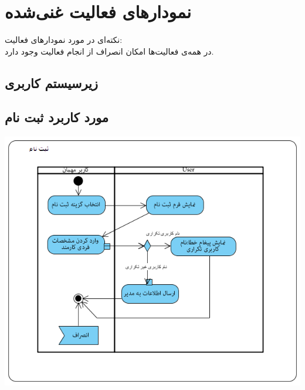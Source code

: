 
\newpage
\section{نمودارهای فعالیت غنی‌شده}

نکته‌ای در مورد نمودارهای فعالیت:
\\
در همه‌ی فعالیت‌ها امکان انصراف از انجام فعالیت وجود دارد.

\vspace{1cm}
\subsection{زیرسیستم کاربری}

\vspace{1cm}
\subsection*{مورد کاربرد ثبت نام}
\vspace{2cm}
\begin{center}
\includegraphics[width=\textwidth]{ActivityDiagramsWithSwimlanes/1.png}
\end{center}

\newpage
\vspace{2cm}
